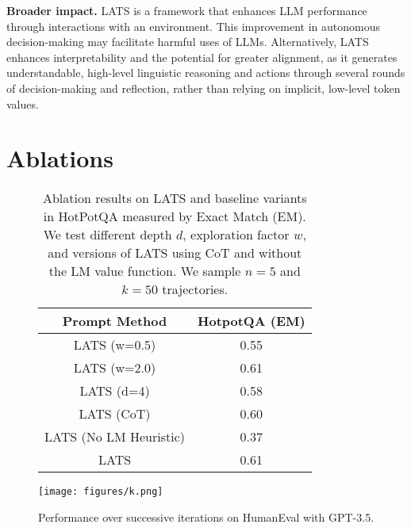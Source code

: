 \documentclass{article} \usepackage{iclr2024_conference,times}
\begin{document}
\textbf{Broader impact.} LATS is a framework that enhances LLM performance through interactions with an environment. This improvement in autonomous decision-making may facilitate harmful uses of LLMs. Alternatively, LATS enhances interpretability and the potential for greater alignment, as it generates understandable, high-level linguistic reasoning and actions through several rounds of decision-making and reflection, rather than relying on implicit, low-level token values.
{
\section{Ablations}\label{sec:abl}

\begin{figure}[t]
   
    \centering
    \begin{minipage}{.48\textwidth}
        \centering
        \begin{table}[H]
            \begin{tabular}{c|c}
                \toprule
                \textbf{Prompt Method} & \textbf{HotpotQA (EM)} \\
                \midrule
                LATS (w=0.5) & 0.55 \\
                LATS (w=2.0) & 0.61 \\
                LATS (d=4) & 0.58 \\
                LATS (CoT) & 0.60 \\
                LATS (No LM Heuristic) & 0.37 \\
                LATS & 0.61 \\ 
                \bottomrule
            \end{tabular}
    \caption{Ablation results on LATS and baseline variants in HotPotQA measured by Exact Match (EM). We test different depth $d$, exploration factor $w$, and versions of LATS using CoT and without the LM value function. We sample $n=5$ and $k=50$ trajectories.}
        \end{table}

        \label{tab:hotpotqa}
    \end{minipage}\hspace{4pt}
    \begin{minipage}{.48\textwidth}
        \centering
         \texttt{[image: figures/k.png]}
        \vspace{-0.1in}
        \caption{ Performance over successive iterations on HumanEval with GPT-3.5.}
        \label{fig:k}
    \end{minipage}
\end{figure}


}
\end{document}
